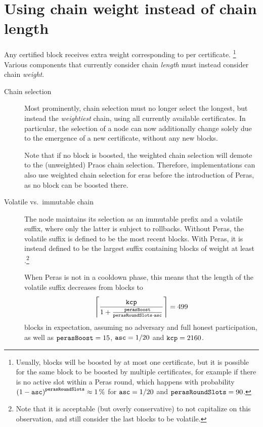 \section{Using chain weight instead of chain length}\label{sec:weight not length}

Any certified block receives extra weight corresponding to \perasBoost{} per certificate.%
\footnote{Usually, blocks will be boosted by at most one certificate, but it is possible for the same block to be boosted by multiple certificates, for example if there is no active slot within a Peras round, which happens with probability ${(1-\mathtt{asc})}^{\mathtt{perasRoundSlots}} \approx \qty{1}{\percent}$ for $\mathtt{asc}=1/20$ and $\mathtt{perasRoundSlots}=90$.}
Various components that currently consider chain \emph{length} must instead consider chain \emph{weight}.

\begin{description}
\item[Chain selection]
  Most prominently, chain selection must no longer select the longest, but instead the \emph{weightiest} chain, using all currently available certificates.
  In particular, the selection of a node can now additionally change solely due to the emergence of a new certificate, without any new blocks.

  Note that if no block is boosted, the weighted chain selection will demote to the (unweighted) Praos chain selection.
  Therefore, implementations can also use weighted chain selection for eras before the introduction of Peras, as no block can be boosted there.
\item[Volatile vs.\ immutable chain]
  The node maintains its selection as an immutable prefix and a volatile suffix, where only the latter is subject to rollbacks.
  Without Peras, the volatile suffix is defined to be the \kcp{} most recent blocks.
  With Peras, it is instead defined to be the largest suffix containing blocks of weight at least \kcp{}.\footnote{
    Note that it is acceptable (but overly conservative) to not capitalize on this observation, and still consider the last \kcp{} blocks to be volatile.}

  When Peras is not in a cooldown phase, this means that the length of the volatile suffix decreases from \kcp{} blocks to
  \[ \left\lceil \frac{\mathtt{kcp} }{1 + \frac{\mathtt{perasBoost}}{\mathtt{perasRoundSlots} \cdot \mathtt{asc}}} \right\rceil = 499 \]
  blocks in expectation, assuming no adversary and full honest participation, as well as $\mathtt{perasBoost} = 15$, $\mathtt{asc} = 1/20$ and $\mathtt{kcp} = 2160$.


\end{description}
